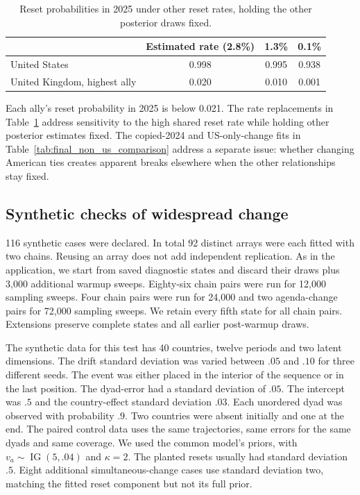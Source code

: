 \documentclass[10pt,authoryear]{elsarticle}
\begin{document}
\begin{table}[ht]
\centering\small
\caption{Reset probabilities in 2025 under other reset rates, holding the other posterior draws fixed.}
\label{tab:reset_rate}
\begin{tabular}{lccc}\toprule
 & Estimated rate (2.8\%) & 1.3\% & 0.1\%\\\midrule
United States & 0.998 & 0.995 & 0.938\\
United Kingdom, highest ally & 0.020 & 0.010 & 0.001\\
\bottomrule
\end{tabular}
\end{table}

Each ally's reset probability in 2025 is below 0.021. The rate replacements in Table~\ref{tab:reset_rate} address sensitivity to the high shared reset rate while holding other posterior estimates fixed. The copied-2024 and US-only-change fits in Table~\ref{tab:final_non_us_comparison} address a separate issue: whether changing American ties creates apparent breaks elsewhere when the other relationships stay fixed.

\subsection{Synthetic checks of widespread change}

116 synthetic cases were declared. In total 92 distinct arrays were each fitted with two chains. Reusing an array does not add independent replication. As in the application, we start from saved diagnostic states and discard their draws plus 3,000 additional warmup sweeps. Eighty-six chain pairs were run for 12,000 sampling sweeps. Four chain pairs were run for 24,000 and two agenda-change pairs for 72,000 sampling sweeps. We retain every fifth state for all chain pairs. Extensions preserve complete states and all earlier post-warmup draws.

The synthetic data for this test has 40 countries, twelve periods and two latent dimensions. The drift standard deviation was varied between $.05$ and $.10$ for three different seeds. The event was either placed in the interior of the sequence or in the last position. The dyad-error had a standard deviation of $.05$. The intercept was $.5$ and the country-effect standard deviation $.03$. Each unordered dyad was observed with probability $.9$. Two countries were absent initially and one at the end. The paired control data uses the same trajectories, same errors for the same dyads and same coverage. We used the common model’s priors, with $v_a\sim\operatorname{IG}(5,.04)$ and $\kappa=2$. The planted resets usually had standard deviation $.5$. Eight additional simultaneous-change cases use standard deviation two, matching the fitted reset component but not its full prior.
\end{document}
